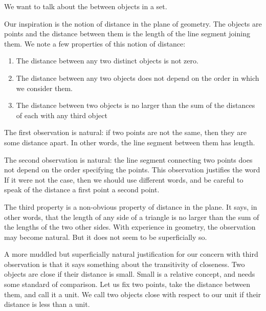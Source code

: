 

We want to talk about the  between objects in a set.


Our inspiration is the notion of distance in the plane of geometry.
The objects are points and the distance between them is the length of the line segment joining them.
We note a few properties of this notion of distance:

\begin{enumerate}
  \item
    The distance between any two
    distinct objects is not zero.

  \item
    The distance between any
    two objects does not depend
    on the order in which we
    consider them.

  \item
    The distance between
    two objects is no larger
    than the sum of the distances
    of each with any third object
\end{enumerate}

The first observation
is natural: if two points are not
the same, then they are some
distance apart.
In other words, the line
segment between
them has length.

The second observation is natural:
the line segment connecting
two points does not depend on the
order specifying the points.
This observation
justifies the word
If it were not the case,
then we should use different words,
and be careful to speak
of the distance  a
first point  a second
point.

The third property is
a non-obvious property of
distance in the plane.
It says, in other words,
that the length of any side
of a triangle is no larger than
the sum of the lengths of the
two other sides.
With experience in geometry,
the observation may become
natural. But it does
not seem to be superficially so.

A more muddled but superficially
natural justification for our
concern with third observation
is that it says something
about the transitivity of
closeness.
Two objects are close if
their distance is small.
Small is a relative concept,
and needs some standard of
comparison.
Let us fix two points, take
the distance between them,
and call it a unit.
We call two objects close
with respect to our unit
if their distance is less than a unit.

